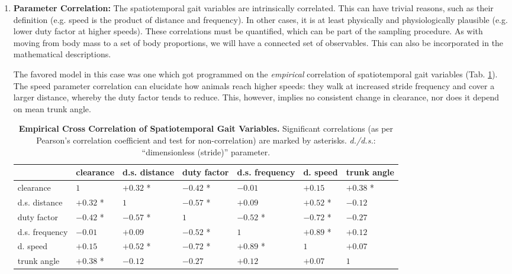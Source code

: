 \begin{enumerate}
\item \textbf{Parameter Correlation:}
\label{sec:orgccc0e5d}
The spatiotemporal gait variables are intrinsically correlated.
This can have trivial reasons, such as their definition (e.g. speed is the product of distance and frequency).
In other cases, it is at least physically and physiologically plausible (e.g. lower duty factor at higher speeds).
These correlations must be quantified, which can be part of the sampling procedure.
As with moving from body mass to a set of body proportions, we will have a connected set of observables.
This can also be incorporated in the mathematical descriptions.


The favored model in this case was one which got programmed on the \emph{empirical} correlation of spatiotemporal gait variables (Tab. \ref{tab:stridecorrelation}).
The speed parameter correlation can elucidate how animals reach higher speeds: they walk at increased stride frequency and cover a larger distance, whereby the duty factor tends to reduce.
This, however, implies no consistent change in clearance, nor does it depend on mean trunk angle.

\begin{table}[p]
\caption{\label{tab:stridecorrelation}\textbf{Empirical Cross Correlation of Spatiotemporal Gait Variables.} Significant correlations (as per Pearson's correlation coefficient and test for non-correlation) are marked by asterisks. \emph{d./d.s.}: ``dimensionless (stride)'' parameter.}
\centering
\begin{footnotesize}
\begin{tabular}{l|llllll}
 & clearance & d.s. distance & duty factor & d.s. frequency & d. speed & trunk angle\\[0pt]
\hline
clearance & \(1\) & \(+0.32\) * & \(-0.42\) * & \(-0.01\) & \(+0.15\) & \(+0.38\) *\\[0pt]
d.s. distance & \(+0.32\) * & \(1\) & \(-0.57\) * & \(+0.09\) & \(+0.52\) * & \(-0.12\)\\[0pt]
duty factor & \(-0.42\) * & \(-0.57\) * & \(1\) & \(-0.52\) * & \(-0.72\) * & \(-0.27\)\\[0pt]
d.s. frequency & \(-0.01\) & \(+0.09\) & \(-0.52\) * & \(1\) & \(+0.89\) * & \(+0.12\)\\[0pt]
d. speed & \(+0.15\) & \(+0.52\) * & \(-0.72\) * & \(+0.89\) * & \(1\) & \(+0.07\)\\[0pt]
trunk angle & \(+0.38\) * & \(-0.12\) & \(-0.27\) & \(+0.12\) & \(+0.07\) & \(1\)\\[0pt]
\end{tabular}
\end{footnotesize}
\end{table}




\end{enumerate}
